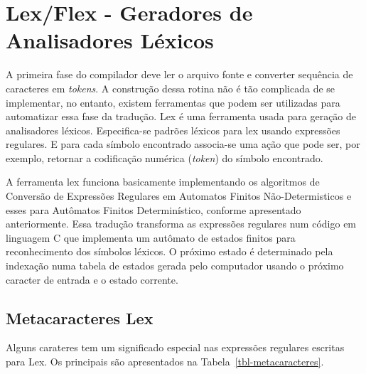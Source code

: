 \documentclass[
  brazilian,
  letterpaper,
]{book}
\theoremstyle{plain}
\theoremstyle{definition}
\theoremstyle{remark}
\begin{document}
\section{Lex/Flex - Geradores de Analisadores
Léxicos}\label{lexflex---geradores-de-analisadores-luxe9xicos}

A primeira fase do compilador deve ler o arquivo fonte e converter
sequência de caracteres em \emph{tokens}. A construção dessa rotina não
é tão complicada de se implementar, no entanto, existem ferramentas que
podem ser utilizadas para automatizar essa fase da tradução. Lex é uma
ferramenta usada para geração de analisadores léxicos. Especifica-se
padrões léxicos para lex usando expressões regulares. E para cada
símbolo encontrado associa-se uma ação que pode ser, por exemplo,
retornar a codificação numérica (\emph{token}) do símbolo encontrado.

A ferramenta lex funciona basicamente implementando os algoritmos de
Conversão de Expressões Regulares em Automatos Finitos Não-Determisticos
e esses para Autômatos Finitos Determinístico, conforme apresentado
anteriormente. Essa tradução transforma as expressões regulares num
código em linguagem C que implementa um autômato de estados finitos para
reconhecimento dos símbolos léxicos. O próximo estado é determinado pela
indexação numa tabela de estados gerada pelo computador usando o próximo
caracter de entrada e o estado corrente.

\subsection{Metacaracteres Lex}\label{metacaracteres-lex}

Alguns carateres tem um significado especial nas expressões regulares
escritas para Lex. Os principais são apresentados na
Tabela~\ref{tbl-metacaracteres}.
\end{document}
